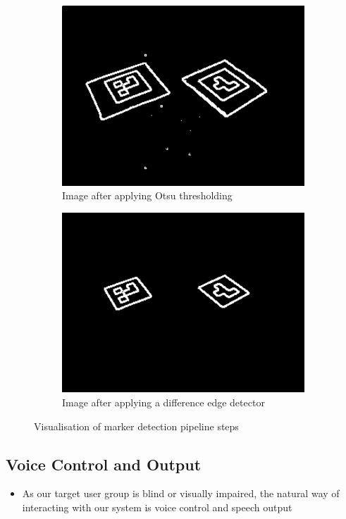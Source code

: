 \begin{figure}[thpb]
\begin{subfigure}[b]{0.45\columnwidth}
        \includegraphics[width=\columnwidth]{otsu.png}
				\caption{Image after applying Otsu thresholding}
				\label{fig:otsu}
    \end{subfigure}
    \begin{subfigure}[b]{0.45\columnwidth}
        \centering
        \includegraphics[width=\columnwidth]{edge.png}
				\caption{Image after applying a difference edge detector} \label{fig:finalmarker}
    \end{subfigure}
    \caption{Visualisation of marker detection pipeline steps}
		\label{fig:markerdetection}
\end{figure}


\subsection{Voice Control and Output}
\begin{itemize}
	\item
		As our target user group is blind or visually impaired, the natural way of interacting with our system is voice control and speech output
\end{itemize}
